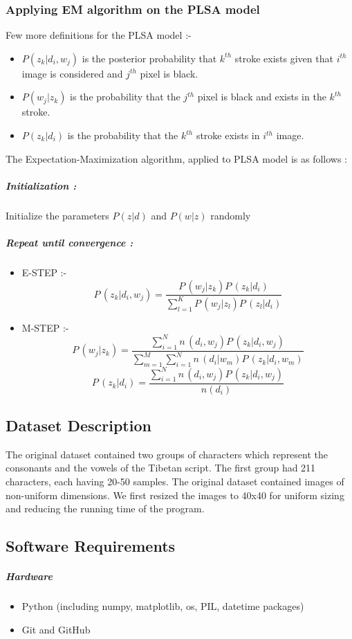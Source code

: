 \documentclass[10pt]{article}
\begin{document}
		\subsubsection{Applying EM algorithm on the PLSA model}
			Few more definitions for the PLSA model \cite{hoff1} :-
			\begin{itemize}
				\item 
				$P(z_k|d_i,w_j)$ is the posterior probability that $k^{th}$ stroke exists given that $i^{th}$ image is considered and $j^{th}$ pixel is black.
				\item
				$P(w_j|z_k)$ is the probability that the $j^{th}$ pixel is black and exists in the $k^{th}$ stroke.
				\item
				$P(z_k|d_i)$ is the probability that the $k^{th}$ stroke exists in $i^{th}$ image.
			\end{itemize}
			The Expectation-Maximization \cite{dataera} algorithm, applied to PLSA model is as follows :
			\subparagraph{Initialization :}
				Initialize the parameters $P(z|d)$ and $P(w|z)$ randomly
			\subparagraph{Repeat until convergence :}
			\begin{itemize}
				\item
				E-STEP :- 
				\[ P\,(z_k|d_i,w_j) = \dfrac{P\,(w_j|z_k)P\,(z_k|d_i)}{\sum_{l=1}^{K}P\,(w_j|z_l)P\,(z_l|d_i)} \]
				\item
				M-STEP :-
				\[ P\,(w_j|z_k) = \dfrac{\sum_{i=1}^{N}n\,(d_i,w_j)P\,(z_k|d_i,w_j)}{\sum_{m=1}^{M}\sum_{i=1}^{N}n\,(d_i|w_m)P\,(z_k|d_i,w_m)} \]
				\[ P\,(z_k|d_i) = \dfrac{\sum_{i=1}^{N}n\,(d_i,w_j)P\,(z_k|d_i,w_j)}{n(d_i)} \]
			\end{itemize}	 
	\subsection{Dataset Description}
		The original dataset contained two groups of characters which represent the consonants and the vowels of the Tibetan script. The first group had 211 characters, each having 20-50 samples. The original dataset contained images of non-uniform dimensions. We first resized the images to 40x40 for uniform sizing and reducing the running time of the program.
		
	\subsection{Software Requirements}
		\subparagraph{Hardware}
			\begin{itemize}
				\item 
				Python (including  numpy, matplotlib, os, PIL, datetime packages) \cite{pytho}
				\item
				Git and GitHub
			\end{itemize}
\end{document}
